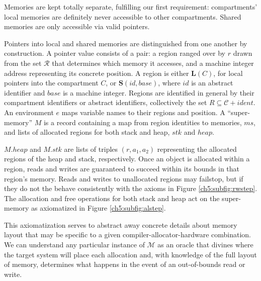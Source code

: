 Memories are kept totally separate, fulfilling our first requirement:
compartments' local memories are definitely never accessible to other compartments.
Shared memories are only accessible via valid pointers.

Pointers into local and shared memories are distinguished from one another by construction.
A pointer value consists of a pair: a region ranged over by \(r\) drawn from the set
\(\mathcal{R}\) that determines which memory it accesses, and a machine integer address representing
its concrete position. A region is either \(\mathbf{L}(C)\), for local pointers into
the compartment \(C\), or \(\mathbf{S}(id,\mathit{base})\), where \(id\) is an
abstract identifier and \(\mathit{base}\) is a machine integer. Regions are identified
in general by their compartment identifiers or abstract identifiers, collectively
the set \(R \subseteq \mathcal{C} + \mathit{ident}\). An environment \(e\) maps variable names to
their regions and position. A ``super-memory'' \(M\)
is a record containing a map from region identities to memories, \(ms\),
and lists of allocated regions for both stack and heap, \(stk\) and \(heap\).

\(M.heap\) and \(M.stk\) are lists of triples \((r, a_1, a_2)\) representing
the allocated regions of the heap and stack, respectively.
Once an object is allocated within a region, reads and writes are guaranteed to succeed
within its bounds in that region's memory. Reads and writes to unallocated regions may
failstop, but if they do not the behave consistently with the axioms in Figure \ref{ch5:subfig:rwstep}.
The allocation and free operations for both stack and heap act on the super-memory
as axiomatized in Figure \ref{ch5:subfig:alstep}.

This axiomatization serves to abstract away concrete details about memory layout
that may be specific to a given compiler-allocator-hardware combination. We can
understand any particular instance of \(\mathcal{M}\) as an oracle that divines where
the target system will place each allocation and, with knowledge of the full layout of
memory, determines what happens in the event of an out-of-bounds read or write.


